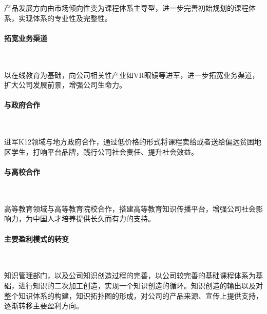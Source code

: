 产品发展方向由市场倾向性变为课程体系主导型，进一步完善初始规划的课程体系，实现体系的专业性及完整性。

\paragraph{拓宽业务渠道}\

以在线教育为基础，向公司相关性产业如VR眼镜等进军，进一步拓宽业务渠道，扩大公司发展前景，增强公司生命力。

\paragraph{与政府合作}\

进军K12领域与地方政府合作，通过低价格的形式将课程卖给或者送给偏远贫困地区学生，打响平台品牌，践行公司社会责任、提升社会效益。

\paragraph{与高校合作}\

高等教育领域与高等教育院校合作，搭建高等教育知识传播平台，增强公司社会影响力，为中国人才培养提供长久而有力的支持。

\paragraph{主要盈利模式的转变}\

知识管理部门，以及公司知识创造过程的完善，以公司较完善的基础课程体系为基础，进行知识的二次加工创造，实现一个知识创造的循环。知识创造的输出以及对整个知识体系的构建，知识拓扑图的形成，对公司的产品来源、宣传上提供支持，逐渐转移主要盈利方向。

